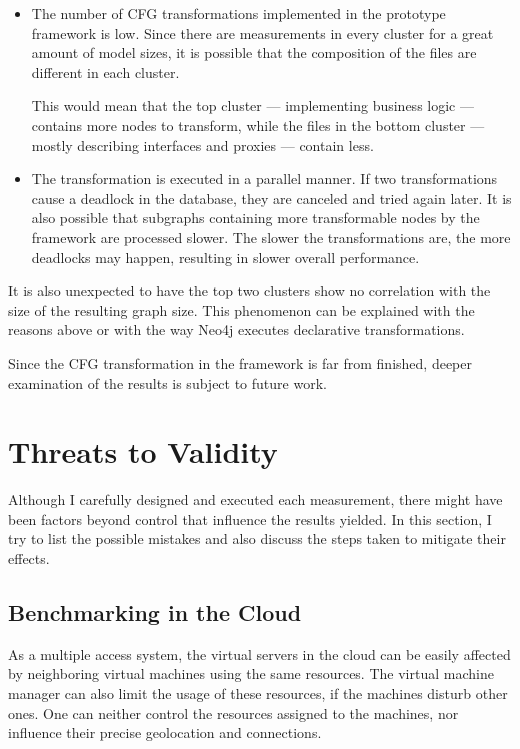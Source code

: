 \begin{itemize}[topsep=0pt]
  \item The number of CFG transformations implemented in the prototype framework is low. Since there are measurements in every cluster for a great amount of model sizes, it is possible that the composition of the files are different in each cluster.

  This would mean that the top cluster --- implementing business logic --- contains more nodes to transform, while the files in the bottom cluster --- mostly describing interfaces and proxies --- contain less.

  \item The transformation is executed in a parallel manner. If two transformations cause a deadlock in the database, they are canceled and tried again later. It is also possible that subgraphs containing more transformable nodes by the framework are processed slower. The slower the transformations are, the more deadlocks may happen, resulting in slower overall performance.
\end{itemize}

It is also unexpected to have the top two clusters show no correlation with the size of the resulting graph size. This phenomenon can be explained with the reasons above or with the way Neo4j executes declarative transformations.

Since the CFG transformation in the framework is far from finished, deeper examination of the results is subject to future work.


\section{Threats to Validity}
\label{sect:evaluation-threats}
Although I carefully designed and executed each measurement, there might have been factors beyond control that influence the results yielded. In this section, I try to list the possible mistakes and also discuss the steps taken to mitigate their effects.

\subsection{Benchmarking in the Cloud} As a multiple access system, the virtual servers in the cloud can be easily affected by neighboring virtual machines using the same resources. The virtual machine manager can also limit the usage of these resources, if the machines disturb other ones. One can neither control the resources assigned to the machines, nor influence their precise geolocation and connections.

